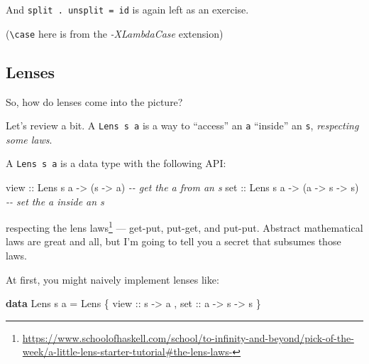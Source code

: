 \documentclass[]{article}
\newenvironment{Shaded}{}{}
\newcommand{\CommentTok}[1]{\textcolor[rgb]{0.38,0.63,0.69}{\textit{#1}}}
\newcommand{\DataTypeTok}[1]{\textcolor[rgb]{0.56,0.13,0.00}{#1}}
\newcommand{\KeywordTok}[1]{\textcolor[rgb]{0.00,0.44,0.13}{\textbf{#1}}}
\newcommand{\NormalTok}[1]{#1}
\newcommand{\OtherTok}[1]{\textcolor[rgb]{0.00,0.44,0.13}{#1}}
\renewcommand{\href}[2]{#2\footnote{\url{#1}}}
\begin{document}
And \texttt{split\ .\ unsplit\ =\ id} is again left as an exercise.

(\texttt{\textbackslash{}case} here is from the \emph{-XLambdaCase} extension)

\subsection{Lenses}\label{lenses}

So, how do lenses come into the picture?

Let's review a bit. A \texttt{Lens\textquotesingle{}\ s\ a} is a way to
``access'' an \texttt{a} ``inside'' an \texttt{s}, \emph{respecting some laws}.

A \texttt{Lens\textquotesingle{}\ s\ a} is a data type with the following API:

\begin{Shaded}
\begin{Highlighting}[]
\OtherTok{view ::} \DataTypeTok{Lens\textquotesingle{}}\NormalTok{ s a }\OtherTok{{-}\textgreater{}}\NormalTok{ (s }\OtherTok{{-}\textgreater{}}\NormalTok{ a)                }\CommentTok{{-}{-} get the \textquotesingle{}a\textquotesingle{} from an \textquotesingle{}s\textquotesingle{}}
\OtherTok{set  ::} \DataTypeTok{Lens\textquotesingle{}}\NormalTok{ s a }\OtherTok{{-}\textgreater{}}\NormalTok{ (a }\OtherTok{{-}\textgreater{}}\NormalTok{ s }\OtherTok{{-}\textgreater{}}\NormalTok{ s)           }\CommentTok{{-}{-} set the \textquotesingle{}a\textquotesingle{} inside an \textquotesingle{}s\textquotesingle{}}
\end{Highlighting}
\end{Shaded}

respecting
\href{https://www.schoolofhaskell.com/school/to-infinity-and-beyond/pick-of-the-week/a-little-lens-starter-tutorial\#the-lens-laws-}{the
lens laws} --- get-put, put-get, and put-put. Abstract mathematical laws are
great and all, but I'm going to tell you a secret that subsumes those laws.

At first, you might naively implement lenses like:

\begin{Shaded}
\begin{Highlighting}[]
\KeywordTok{data} \DataTypeTok{Lens\textquotesingle{}}\NormalTok{ s a }\OtherTok{=} \DataTypeTok{Lens\textquotesingle{}}
\NormalTok{    \{}\OtherTok{ view ::}\NormalTok{ s }\OtherTok{{-}\textgreater{}}\NormalTok{ a}
\NormalTok{    ,}\OtherTok{ set  ::}\NormalTok{ a }\OtherTok{{-}\textgreater{}}\NormalTok{ s }\OtherTok{{-}\textgreater{}}\NormalTok{ s}
\NormalTok{    \}}
\end{Highlighting}
\end{Shaded}
\end{document}
